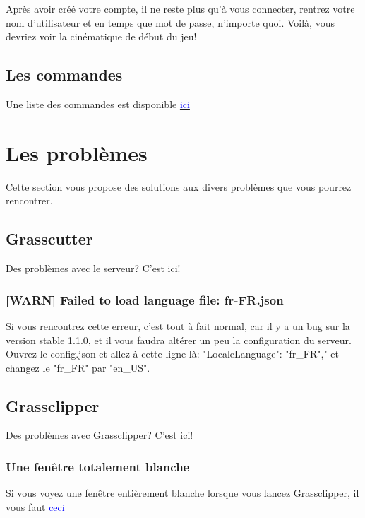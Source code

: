 \documentclass{article}
\begin{document}
Après avoir créé votre compte, il ne reste plus qu'à vous connecter, rentrez votre nom d'utilisateur et en temps que mot de passe, n'importe quoi.\newline
Voilà, vous devriez voir la cinématique de début du jeu!

\subsection{Les commandes}
Une liste des commandes est disponible \href{https://github.com/Grasscutters/Grasscutter/wiki/Commands}{\textcolor{blue}{ici}}

\section{Les problèmes}
Cette section vous propose des solutions aux divers problèmes que vous pourrez rencontrer.

\subsection{Grasscutter}
Des problèmes avec le serveur? C'est ici!

\subsubsection{[WARN] Failed to load language file: fr-FR.json}
Si vous rencontrez cette erreur, c'est tout à fait normal, car il y a un bug sur la version stable 1.1.0, et il vous faudra altérer un peu la configuration du serveur.\newline
Ouvrez le config.json et allez à cette ligne là: "LocaleLanguage": "fr\_FR"," et changez le "fr\_FR" par "en\_US".

\subsection{Grassclipper}
Des problèmes avec Grassclipper? C'est ici!

\subsubsection{Une fenêtre totalement blanche}
Si vous voyez une fenêtre entièrement blanche lorsque vous lancez Grassclipper, il vous faut \href{https://developer.microsoft.com/en-us/microsoft-edge/webview2/#download}{\textcolor{blue}{ceci}}
\end{document}
